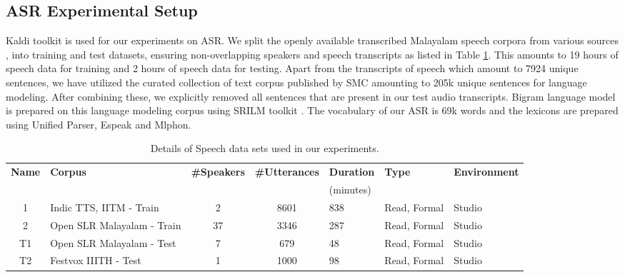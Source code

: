 \documentclass{ieeeaccess}
\begin{document}
\subsection*{ASR Experimental Setup}


Kaldi toolkit \cite{povey2011kaldi} is used for our experiments on ASR. We split the openly available transcribed Malayalam speech corpora from various sources \cite{prahallad2012iiit,baby2016resources, he-etal-2020-open}, into training and test datasets, ensuring non-overlapping speakers and speech transcripts as listed in Table \ref{speechdatasets}. This amounts to 19 hours of speech data for training and 2 hours of speech data for testing. Apart from the transcripts of speech which amount to 7924 unique sentences, we have utilized the curated collection of  text corpus published by SMC \cite{smctext} amounting to 205k unique sentences for language modeling. After combining these, we explicitly removed all sentences that are present in our test audio transcripts. Bigram language model is prepared on this language modeling corpus using SRILM toolkit \cite{stolcke2002srilm}. The  vocabulary of our ASR is 69k words and the lexicons are prepared using Unified Parser, Espeak and Mlphon.

\begin{table}[]
  \caption{Details of Speech data sets used in our experiments. }
  \label{speechdatasets}
        \centering
  \begin{tabular}{clcclll}
    \hline \hline
    \textbf{Name}& \textbf{Corpus}                                      & \textbf{\#Speakers}      & \textbf{\#Utterances}    & \textbf{Duration} &  \textbf{Type}   & \textbf{Environment}   \\
        &                                   &      &     & (minutes) &    & \\
    \hline
    1&Indic TTS, IITM \cite{baby2016resources}- Train          &2                          & 8601                      &838                         & Read, Formal          &Studio \\
    2&Open SLR Malayalam \cite{he-etal-2020-open} - Train &37                         & 3346                      &287                      &  Read, Formal         &Studio \\ 
    T1&Open SLR Malayalam \cite{he-etal-2020-open} - Test  &7                          & 679                       & 48                       &  Read, Formal         &Studio \\ 
    T2&Festvox IIITH \cite{prahallad2012iiit} - Test            &1                          &1000                       & 98                        & Read, Formal          &Studio \\

    \hline
    
    
  \end{tabular}

\end{table}
\end{document}
